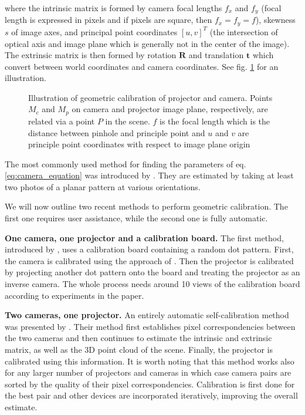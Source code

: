 where the intrinsic matrix is formed by camera focal lengths \(f_x\) and \(f_y\) (focal length is expressed in pixels and if pixels are square, then \(f_x = f_y = f\)), skewness \(s\) of image axes, and principal point coordinates \([u, v]^T\) (the intersection of optical axis and image plane which is generally not in the center of the image). The extrinsic matrix is then formed by rotation \(\mathbf{R}\) and translation \(\mathbf{t}\) which convert between world coordinates and camera coordinates. See fig. \ref{fig:background_camera_calibration} for an illustration.

\begin{figure}[ht]
    \centering
    \def\svgwidth{0.8\textwidth}
    
    \caption{Illustration of geometric calibration of projector and camera. Points \(M_c\) and \(M_p\) on camera and projector image plane, respectively, are related via a point \(P\) in the scene. \(f\) is the focal length which is the distance between pinhole and principle point and \(u\) and \(v\) are principle point coordinates with respect to image plane origin}
    \label{fig:background_camera_calibration}
\end{figure}

The most commonly used method for finding the parameters of eq. \ref{eq:camera_equation} was introduced by \citet{Zhang1999}. They are estimated by taking at least two photos of a planar pattern at various orientations.

We will now outline two recent methods to perform geometric calibration. The first one requires user assistance, while the second one is fully automatic.

\textbf{One camera, one projector and a calibration board.} The first method, introduced by \citet{Yang2016}, uses a calibration board containing a random dot pattern. First, the camera is calibrated using the approach of \citet{Zhang1999}. Then the projector is calibrated by projecting another dot pattern onto the board and treating the projector as an inverse camera. The whole process needs around 10 views of the calibration board according to experiments in the paper.

\textbf{Two cameras, one projector.} An entirely automatic self-calibration method was presented by \citet{Willi2017}. Their method first establishes pixel correspondencies between the two cameras and then continues to estimate the intrinsic and extrinsic matrix, as well as the 3D point cloud of the scene. Finally, the projector is calibrated using this information. It is worth noting that this method works also for any larger number of projectors and cameras in which case camera pairs are sorted by the quality of their pixel correspondencies. Calibration is first done for the best pair and other devices are incorporated iteratively, improving the overall estimate.

